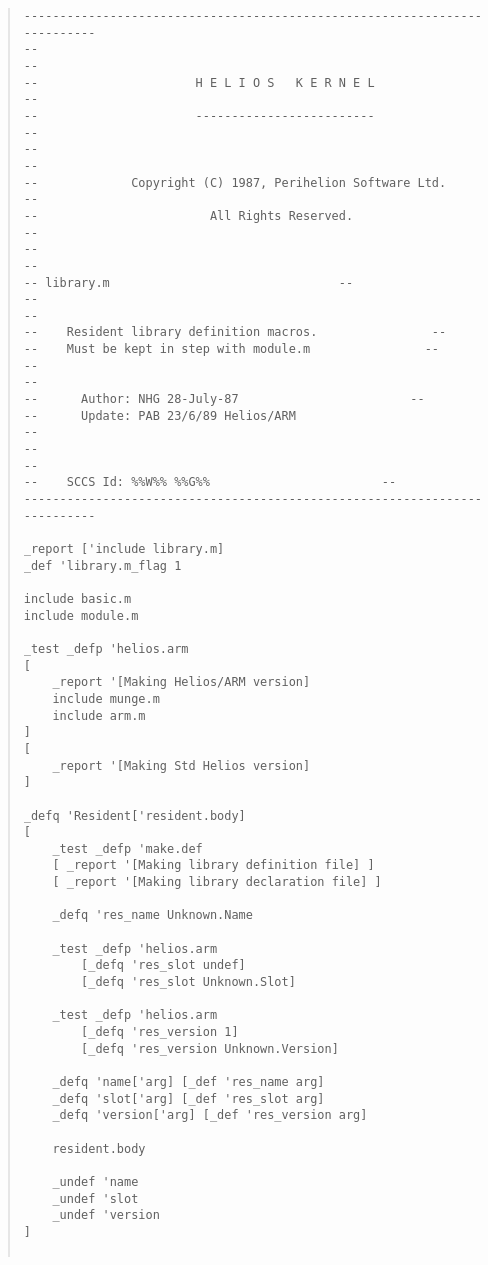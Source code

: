 \begin {quote}
\scriptsize
\begin{verbatim}
--------------------------------------------------------------------------
--                                                                      --
--                      H E L I O S   K E R N E L                       --
--                      -------------------------                       --
--                                                                      --
--             Copyright (C) 1987, Perihelion Software Ltd.             --
--                        All Rights Reserved.                          --
--                                                                      --
-- library.m                                --
--                                                                      --
--    Resident library definition macros.                --
--    Must be kept in step with module.m                --
--                                                                      --
--      Author: NHG 28-July-87                        --
--      Update: PAB 23/6/89 Helios/ARM                                  --
--                                                                      --
--    SCCS Id: %%W%% %%G%%                        --
--------------------------------------------------------------------------

_report ['include library.m]
_def 'library.m_flag 1

include basic.m
include module.m

_test _defp 'helios.arm
[
    _report '[Making Helios/ARM version]
    include munge.m
    include arm.m
]
[
    _report '[Making Std Helios version]
]

_defq 'Resident['resident.body]
[
    _test _defp 'make.def
    [ _report '[Making library definition file] ]
    [ _report '[Making library declaration file] ]

    _defq 'res_name Unknown.Name

    _test _defp 'helios.arm
        [_defq 'res_slot undef]
        [_defq 'res_slot Unknown.Slot]

    _test _defp 'helios.arm
        [_defq 'res_version 1]
        [_defq 'res_version Unknown.Version]

    _defq 'name['arg] [_def 'res_name arg]
    _defq 'slot['arg] [_def 'res_slot arg]
    _defq 'version['arg] [_def 'res_version arg]

    resident.body

    _undef 'name
    _undef 'slot
    _undef 'version
]


\end{verbatim}
\end{quote}
